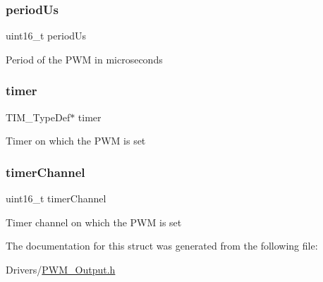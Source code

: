 \subsubsection{\texorpdfstring{period\+Us}{periodUs}}
{\footnotesize\ttfamily uint16\+\_\+t period\+Us}

Period of the P\+WM in microseconds \mbox{\label{struct_p_w_m___type_def_a5f2d7e0e880def3262a850626e3df17d}} 
\subsubsection{\texorpdfstring{timer}{timer}}
{\footnotesize\ttfamily T\+I\+M\+\_\+\+Type\+Def$\ast$ timer}

Timer on which the P\+WM is set \mbox{\label{struct_p_w_m___type_def_a2ceeb6205773419966e920a22828f526}} 
\subsubsection{\texorpdfstring{timer\+Channel}{timerChannel}}
{\footnotesize\ttfamily uint16\+\_\+t timer\+Channel}

Timer channel on which the P\+WM is set 

The documentation for this struct was generated from the following file\+:\begin{DoxyCompactItemize}
\item 
Drivers/\hyperlink{_p_w_m___output_8h}{P\+W\+M\+\_\+\+Output.\+h}\end{DoxyCompactItemize}
